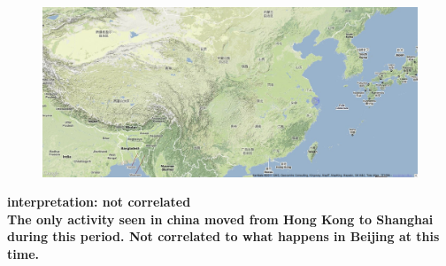 \documentclass[11pt,a4paper,english]{article}
\begin{document}
\begin{itemize}
\begin{figure}[H]
	  						\begin{center}
								\includegraphics[width=130mm]{img/post-olympic}
							\end{center}
							\vspace{-5pt}
						\end{figure}	
						\bf interpretation: \rm not correlated
						\\ The only activity seen in china moved from Hong Kong to Shanghai during this period. Not correlated to what happens in Beijing at this time.
						
						
				\end{itemize}
			
\end{document}
